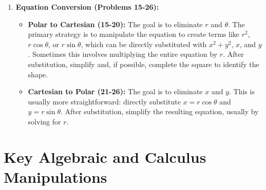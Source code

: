 \documentclass{article}
\begin{document}
\begin{enumerate}
    \item \textbf{Equation Conversion (Problems 15-26):}
    \begin{itemize}
        \item \textbf{Polar to Cartesian (15-20):} The goal is to eliminate \(r\) and \(\theta\). The primary strategy is to manipulate the equation to create terms like \(r^2\), \(r\cos\theta\), or \(r\sin\theta\), which can be directly substituted with \(x^2+y^2\), \(x\), and \(y\). Sometimes this involves multiplying the entire equation by \(r\). After substitution, simplify and, if possible, complete the square to identify the shape.
        \item \textbf{Cartesian to Polar (21-26):} The goal is to eliminate \(x\) and \(y\). This is usually more straightforward: directly substitute \(x = r\cos\theta\) and \(y = r\sin\theta\). After substitution, simplify the resulting equation, usually by solving for \(r\).
    \end{itemize}
\end{enumerate}

\section{Key Algebraic and Calculus Manipulations}
\end{document}
